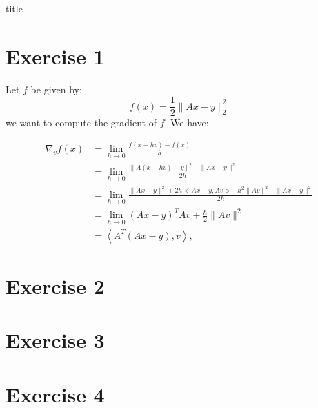 \documentclass[12pt]{article}
\begin{document}
{title}

\tableofcontents




\section{Exercise 1}

Let $f$ be given by:
\begin{equation}
  f(x) = \frac{1}{2} \| Ax - y \|_2^2
\end{equation}
we want to compute the gradient of $f$. We have:

\begin{align*}
  \nabla_v f(x) & =\lim _{h \rightarrow 0} \frac{f(x+h v)-f(x)}{h}                                          \\
                & =\lim _{h \rightarrow 0} \frac{\|A(x+h v)-y\|^2-\|A x-y\|^2}{2 h}                         \\
                & =\lim _{h \rightarrow 0} \frac{\|A x-y\|^2+2 h<A x-y, A v>+h^2\|A v\|^2-\|A x-y\|^2}{2 h} \\
                & =\lim _{h \rightarrow 0}(A x-y)^T A v+\frac{h}{2}\|A v\|^2                                \\
                & =\left\langle A^T(A x-y), v\right\rangle,
\end{align*}













\section{Exercise 2}
\section{Exercise 3}
\section{Exercise 4}


\end{document}
